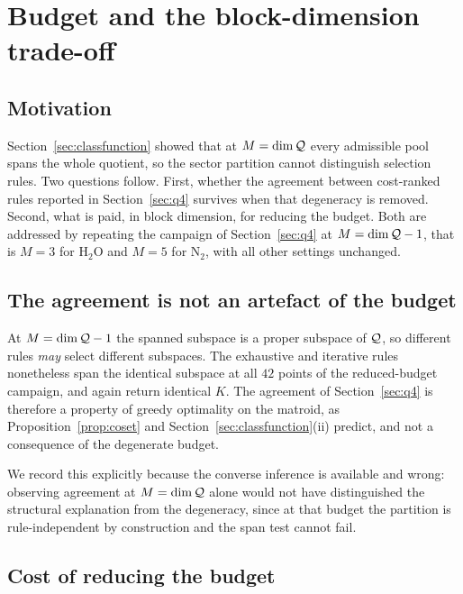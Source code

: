 
\section{Budget and the block-dimension trade-off}
\label{sec:budget}

\subsection{Motivation}

Section~\ref{sec:classfunction} showed that at $M=\dim\mathcal Q$ every admissible
pool spans the whole quotient, so the sector partition cannot distinguish
selection rules. Two questions follow. First, whether the agreement between
cost-ranked rules reported in Section~\ref{sec:q4} survives when that
degeneracy is removed. Second, what is paid, in block dimension, for reducing
the budget. Both are addressed by repeating the campaign of
Section~\ref{sec:q4} at $M=\dim\mathcal Q-1$, that is $M=3$ for $\mathrm{H_2O}$ and $M=5$
for $\mathrm{N_2}$, with all other settings unchanged.

\subsection{The agreement is not an artefact of the budget}

At $M=\dim\mathcal Q-1$ the spanned subspace is a proper subspace of $\mathcal Q$, so
different rules \emph{may} select different subspaces. The exhaustive and
iterative rules nonetheless span the identical subspace at all $42$ points of
the reduced-budget campaign, and again return identical $K$. The agreement of
Section~\ref{sec:q4} is therefore a property of greedy optimality on the
matroid, as Proposition~\ref{prop:coset} and
Section~\ref{sec:classfunction}(ii) predict, and not a consequence of the
degenerate budget.

We record this explicitly because the converse inference is available and
wrong: observing agreement at $M=\dim\mathcal Q$ alone would not have distinguished
the structural explanation from the degeneracy, since at that budget the
partition is rule-independent by construction and the span test cannot fail.

\subsection{Cost of reducing the budget}

